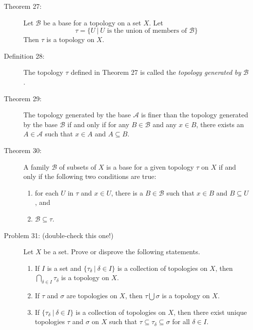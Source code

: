 \documentclass{article}
\begin{document}
\begin{description}
  \item[Theorem 27:] Let $\mathcal{B}$ be a base for a topology on a set $X$. Let
    \begin{equation*}
    \tau = \{ U \ \vert \ U \text{ is the union of members of } \mathcal{B} \}
    \end{equation*}
    Then $\tau$ is a topology on $X$.

  \item[Definition 28:] The topology $\tau$ defined in Theorem 27 is called the \emph{topology generated by} $\mathcal{B}$.

  \item[Theorem 29:] The topology generated by the base $\mathcal{A}$ is finer than the topology generated by the base $\mathcal{B}$ if and only if for any $B \in \mathcal{B}$ and any $x \in B$, there exists an $A \in \mathcal{A}$ such that $x \in A$ and $A \subseteq B$.

  \item[Theorem 30:] A family $\mathcal{B}$ of subsets of $X$ is a base for a given topology $\tau$ on $X$ if and only if the following two conditions are true:
    \begin{enumerate}[\hspace{1cm}1.]
      \item for each $U$ in $\tau$ and $x \in U$, there is a $B \in \mathcal{B}$ such that $x \in B$ and $B \subseteq U$, and
      \item $\mathcal{B} \subseteq \tau$.
    \end{enumerate}

  \item[Problem 31: (double-check this one!)] Let $X$ be a set. Prove or disprove the following statements.
    \begin{enumerate}[\hspace{1cm}1.]
      \item If $I$ is a set and $\{ \tau _{\delta} \ \vert \ \delta \in I \}$ is a collection of topologies on $X$, then $\displaystyle{ \bigcap_{\delta \in I} \tau_{\delta} }$ is a topology on $X$.
      \item If $\tau$ and $\sigma$ are topologies on $X$, then $\tau \bigcup \sigma$ is a topology on $X$.
      \item If $\{ \tau_{\delta} \ \vert \ \delta \in I \}$ is a collection of topologies on $X$, then there exist unique topologies $\tau$ and $\sigma$ on $X$ such that $\tau \subseteq \tau_{\delta} \subseteq \sigma$ for all $\delta \in I$.
    \end{enumerate}


\end{description}
\end{document}
